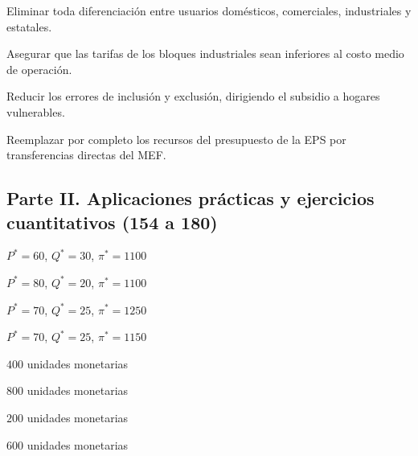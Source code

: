 \begin{opts}
    \item Eliminar toda diferenciación entre usuarios domésticos, comerciales, industriales y estatales.
    \item Asegurar que las tarifas de los bloques industriales sean inferiores al costo medio de operación.
    \item Reducir los errores de inclusión y exclusión, dirigiendo el subsidio a hogares vulnerables.
    \item Reemplazar por completo los recursos del presupuesto de la EPS por transferencias directas del MEF.
\end{opts}

\subsection*{Parte II. Aplicaciones prácticas y ejercicios cuantitativos (154 a 180)}

\begin{opts}
    \item $P^* = 60$, $Q^* = 30$, $\pi^* = 1100$
    \item $P^* = 80$, $Q^* = 20$, $\pi^* = 1100$
    \item $P^* = 70$, $Q^* = 25$, $\pi^* = 1250$
    \item $P^* = 70$, $Q^* = 25$, $\pi^* = 1150$
\end{opts}

\begin{opts}
    \item $400$ unidades monetarias
    \item $800$ unidades monetarias
    \item $200$ unidades monetarias
    \item $600$ unidades monetarias
\end{opts}

